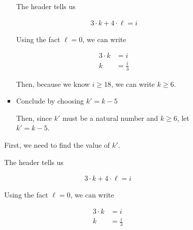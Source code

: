 \documentclass[12pt]{article}
\begin{document}
\begin{itemize}
\begin{mdframed}
\begin{enumerate}[1.]
\begin{enumerate}[1.]
\begin{itemize}
\begin{itemize}
                        \begin{mdframed}
                        The header tells us

                        \begin{align}
                            3 \cdot k + 4 \cdot \ell = i
                        \end{align}

                        \bigskip

                        Using the fact $\ell = 0$, we can write

                        \begin{align}
                            3 \cdot k &= i\\
                            k &= \frac{i}{3}
                        \end{align}

                        \bigskip

                        Then, because we know $i \geq 18$, we can write $k \geq 6$.
                        \end{mdframed}

                        \item Conclude by choosing $k' = k - 5$

                        \begin{mdframed}
                        Then, since $k'$ must be a natural number and $k \geq 6$, let $k' = k - 5$.
                        \end{mdframed}
                    \end{itemize}

                    \begin{mdframed}
                    First, we need to find the value of $k'$.

                    \bigskip

                    The header tells us

                    \begin{align}
                        3 \cdot k + 4 \cdot \ell = i
                    \end{align}

                    \bigskip

                    Using the fact $\ell = 0$, we can write

                    \begin{align}
                        3 \cdot k &= i\\
                        k &= \frac{i}{3}
                    \end{align}


\end{mdframed}
\end{itemize}
\end{enumerate}
\end{enumerate}
\end{mdframed}
\end{itemize}
\end{document}
